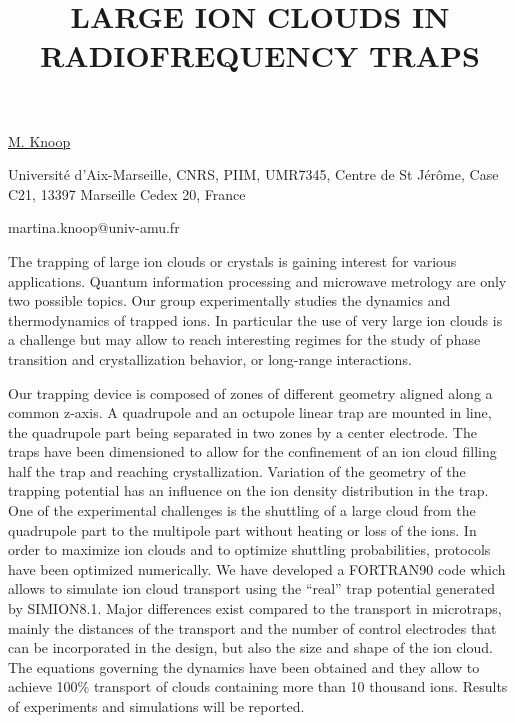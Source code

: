 \title{LARGE ION CLOUDS IN RADIOFREQUENCY TRAPS}

\underline{M. Knoop}

{\normalsize{\vspace{-4mm}
Universit\'e d'Aix-Marseille, CNRS, PIIM, UMR7345, Centre de St J\'er\^ome, Case C21, 13397 Marseille Cedex 20, France

\email martina.knoop@univ-amu.fr}}

The trapping of large ion clouds or crystals is gaining interest for various applications. Quantum information processing and microwave metrology are only two possible topics. Our group experimentally studies the dynamics and thermodynamics of trapped ions. In particular the use of very large ion clouds is a challenge but may allow to reach interesting regimes for the study of phase transition and crystallization behavior, or long-range interactions.

Our trapping device is composed of zones of different geometry aligned along a common z-axis. A quadrupole and an octupole linear trap are mounted in line, the quadrupole part being separated in two zones by a center electrode. The traps have been dimensioned to allow for the confinement of an ion cloud filling half the trap and reaching crystallization. Variation of the geometry of the trapping potential has an influence on the ion density distribution in the trap. One of the experimental challenges is the shuttling of a large cloud from the quadrupole part to the multipole part without heating or loss of the ions. In order to maximize ion clouds and to optimize shuttling probabilities, protocols have been optimized numerically. We have developed a FORTRAN90 code which allows to simulate ion cloud transport using the ``real'' trap potential generated by SIMION8.1. Major differences exist compared to the transport in microtraps, mainly the distances of the transport and the
number of control electrodes that can be incorporated in the design, but also the size and shape of the ion cloud. The equations governing the dynamics have been obtained and they allow to achieve 100$\%$ transport of clouds containing more than 10 thousand ions. Results of experiments and simulations will be reported.

\vspace{\baselineskip}
